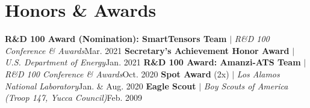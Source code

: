 \section{Honors \& Awards}
    \resumeSubHeadingListStart
      \resumeProjectHeading
          {\textbf{R\&D 100 Award (Nomination): SmartTensors Team} $|$ \emph{R\&D 100 Conference \& Awards}}{Mar. 2021}
      \resumeProjectHeading
          {\textbf{Secretary's Achievement Honor Award} $|$ \emph{U.S. Department of Energy}}{Jan. 2021}
      \resumeProjectHeading
          {\textbf{R\&D 100 Award: Amanzi-ATS Team} $|$ \emph{R\&D 100 Conference \& Awards}}{Oct. 2020}
      \resumeProjectHeading
          {\textbf{Spot Award} (2x) $|$ \emph{Los Alamos National Laboratory}}{Jan. \& Aug. 2020}
      \resumeProjectHeading
          {\textbf{Eagle Scout} $|$ \emph{Boy Scouts of America (Troop 147, Yucca Council)}}{Feb. 2009}
    \resumeSubHeadingListEnd